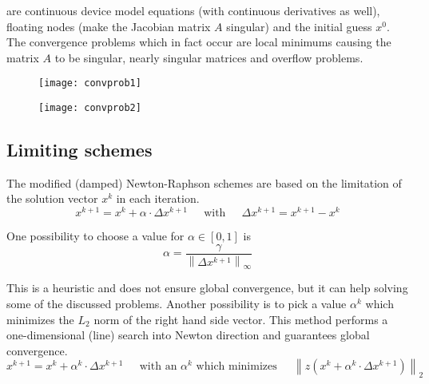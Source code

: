 are continuous device model equations (with continuous derivatives as
well), floating nodes (make the Jacobian matrix $A$ singular) and the
initial guess $x^0$.  The convergence problems which in fact occur are
local minimums causing the matrix $A$ to be singular, nearly singular
matrices and overflow problems.

\begin{figure}[ht]
\begin{center}
\texttt{[image: convprob1]}
\end{center}
\label{fig:ConvProb1}
\end{figure}
\FloatBarrier

\begin{figure}[ht]
\begin{center}
\texttt{[image: convprob2]}
\end{center}
\label{fig:ConvProb2}
\end{figure}
\FloatBarrier

\subsection{Limiting schemes}

The modified (damped) Newton-Raphson schemes are based on the
limitation of the solution vector $x^k$ in each iteration.
\begin{equation}
x^{k+1} = x^k + \alpha\cdot \Delta x^{k+1}
\;\;\;\; \textrm{ with } \;\;\;\;
\Delta x^{k+1} = x^{k+1} - x^k
\end{equation}

One possibility to choose a value for $\alpha \in [0,1]$ is
\begin{equation}
\alpha = \dfrac{\gamma}{\left\lVert\Delta x^{k+1}\right\rVert_{\infty}}
\end{equation}

This is a heuristic and does not ensure global convergence, but it can
help solving some of the discussed problems.  Another possibility is
to pick a value $\alpha^k$ which minimizes the $L_2$ norm of the right
hand side vector.  This method performs a one-dimensional (line)
search into Newton direction and guarantees global convergence.
\begin{equation}
x^{k+1} = x^k + \alpha^k \cdot \Delta x^{k+1}
\;\;\;\; \textrm{ with an } \alpha^k \textrm{ which minimizes } \;\;\;\;
\left\lVert z\left(x^k + \alpha^k \cdot \Delta x^{k+1}\right)\right\rVert_2
\end{equation}

